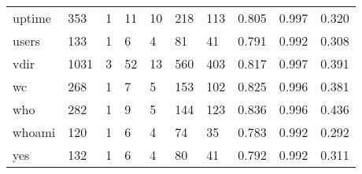 \begin{longtable}{lp{1.3cm}p{1.3cm}p{1.3cm}p{1.3cm}p{1.3cm}p{1.3cm}p{1.3cm}p{1.3cm}p{1.3cm}}
uptime    &                    353 &                                  1 &                                11 &                               10 &                               218 &                             113 &                                   0.805 &                                  0.997 &                                0.320 \\
users     &                    133 &                                  1 &                                 6 &                                4 &                                81 &                              41 &                                   0.791 &                                  0.992 &                                0.308 \\
vdir      &                   1031 &                                  3 &                                52 &                               13 &                               560 &                             403 &                                   0.817 &                                  0.997 &                                0.391 \\
wc        &                    268 &                                  1 &                                 7 &                                5 &                               153 &                             102 &                                   0.825 &                                  0.996 &                                0.381 \\
who       &                    282 &                                  1 &                                 9 &                                5 &                               144 &                             123 &                                   0.836 &                                  0.996 &                                0.436 \\
whoami    &                    120 &                                  1 &                                 6 &                                4 &                                74 &                              35 &                                   0.783 &                                  0.992 &                                0.292 \\
yes       &                    132 &                                  1 &                                 6 &                                4 &                                80 &                              41 &                                   0.792 &                                  0.992 &                                0.311 \\
\end{longtable}
